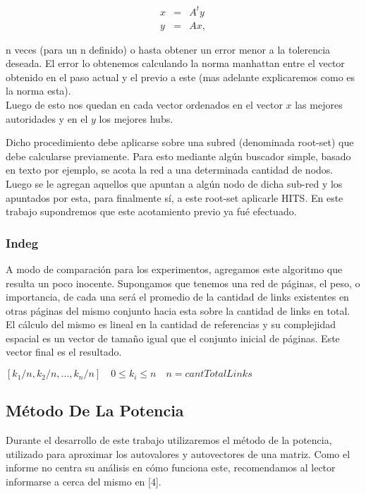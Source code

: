 \begin{eqnarray}
x & = & A^ty \label{eq:auth-update-math} \\
y & = & Ax, \label{eq:hub-update-math} 
\end{eqnarray}

n veces (para un n definido) o hasta obtener un error menor a la tolerencia deseada. El error lo obtenemos calculando la norma manhattan entre el vector obtenido en el paso actual y el previo a este (mas adelante explicaremos como es la norma esta).\\
Luego de esto nos quedan en cada vector ordenados en el vector $x$ las mejores autoridades y en el $y$ los mejores hubs.

Dicho procedimiento debe aplicarse sobre una subred (denominada root-set) que debe calcularse previamente. Para esto mediante algún buscador simple, basado en texto por ejemplo, se acota la red a una determinada cantidad de nodos. Luego se le agregan aquellos que apuntan a algún nodo de dicha sub-red y los apuntados por esta, para finalmente sí, a este root-set aplicarle HITS. En este trabajo supondremos que este acotamiento previo ya fué efectuado.


\subsubsection{Indeg}
A modo de comparación para los experimentos, agregamos este algoritmo que resulta un poco inocente. Supongamos que tenemos una red de páginas, el peso, o importancia, de cada una será el promedio de la cantidad de links existentes en otras páginas del mismo conjunto hacia esta sobre la cantidad de links en total. El cálculo del mismo es lineal en la cantidad de referencias y su complejidad espacial es un vector de tamaño igual que el conjunto inicial de páginas. Este vector final es el resultado.

\begin{center}
$[k_1/n, k_2/n, ..., k_n/n]\quad 0 \leq k_i \leq n \quad n = cantTotalLinks$
\end{center}

\subsection{Método De La Potencia}
Durante el desarrollo de este trabajo utilizaremos el método de la potencia, utilizado para aproximar los autovalores y autovectores de una matriz. Como el informe no centra su análisis en cómo funciona este, recomendamos al lector informarse a cerca del mismo en [4].

